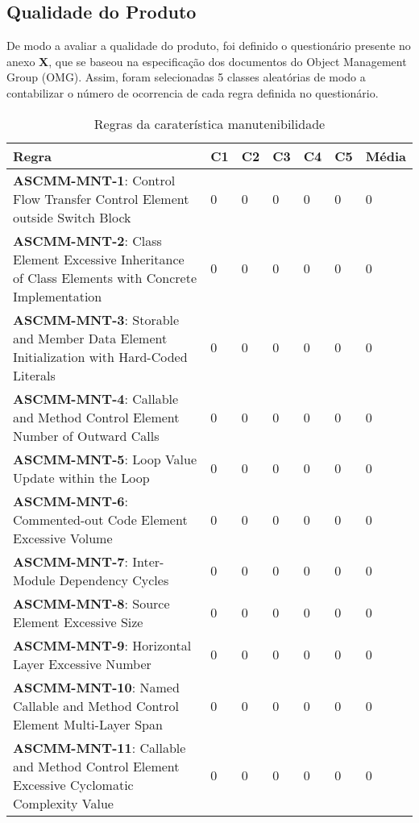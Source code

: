 \documentclass[openany,10pt,a4paper]{article}
\begin{document}
\subsection{Qualidade do Produto}
De modo a avaliar a qualidade do produto, foi definido o questionário presente no anexo \textbf{X}, que se baseou na especificação dos documentos do Object Management Group (OMG). Assim, foram selecionadas 5 classes aleatórias de modo a contabilizar o número de ocorrencia de cada regra definida no questionário. 



\begin{table}[h]
	\centering
	\caption{Regras da caraterística manutenibilidade}
	\begin{tabular}{|p{3in}|p{0.3in}|p{0.3in}|p{0.3in}|p{0.3in}|p{0.3in}|p{0.4in}|}
		\hline	
		\textbf{Regra} & \textbf{C1} & \textbf{C2} & \textbf{C3} & \textbf{C4} & \textbf{C5} & \textbf{Média} \\ \hline
		\textbf{ASCMM-MNT-1}: Control Flow Transfer Control Element outside Switch Block & 0 & 0 & 0 & 0 & 0 & 0 \\ \hline
\textbf{ASCMM-MNT-2}: Class Element Excessive Inheritance of Class Elements with Concrete Implementation & 0 & 0 & 0 & 0 & 0 & 0 \\ \hline
\textbf{ASCMM-MNT-3}: Storable and Member Data Element Initialization with Hard-Coded Literals & 0 & 0 & 0 & 0 & 0 & 0 \\ \hline
\textbf{ASCMM-MNT-4}: Callable and Method Control Element Number of Outward Calls & 0 & 0 & 0 & 0 & 0 & 0 \\ \hline
\textbf{ASCMM-MNT-5}: Loop Value Update within the Loop & 0 & 0 & 0 & 0 & 0 & 0 \\ \hline
\textbf{ASCMM-MNT-6}: Commented-out Code Element Excessive Volume & 0 & 0 & 0 & 0 & 0 & 0 \\ \hline
\textbf{ASCMM-MNT-7}: Inter-Module Dependency Cycles & 0 & 0 & 0 & 0 & 0 & 0 \\ \hline
\textbf{ASCMM-MNT-8}: Source Element Excessive Size & 0 & 0 & 0 & 0 & 0 & 0 \\ \hline
\textbf{ASCMM-MNT-9}: Horizontal Layer Excessive Number & 0 & 0 & 0 & 0 & 0 & 0 \\ \hline
\textbf{ASCMM-MNT-10}: Named Callable and Method Control Element Multi-Layer Span & 0 & 0 & 0 & 0 & 0 & 0 \\ \hline
\textbf{ASCMM-MNT-11}: Callable and Method Control Element Excessive Cyclomatic Complexity Value & 0 & 0 & 0 & 0 & 0 & 0 \\ \hline

\end{tabular}
\end{table}
\end{document}
